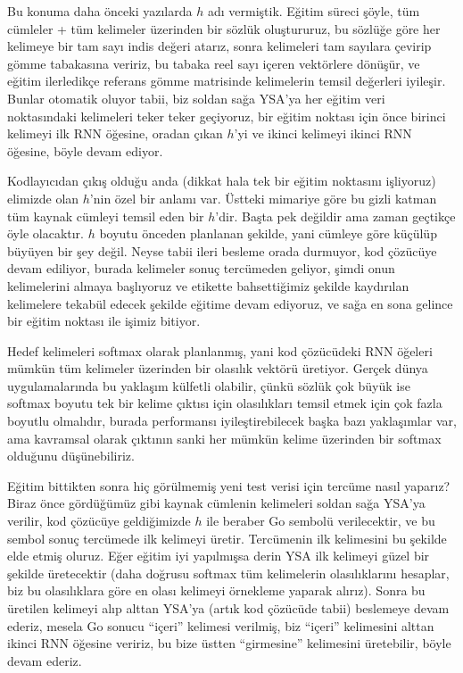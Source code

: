 \documentclass[12pt,fleqn]{article}\usepackage{../../common}
\begin{document}
Bu konuma daha önceki yazılarda $h$ adı vermiştik. Eğitim süreci şöyle, tüm
cümleler + tüm kelimeler üzerinden bir sözlük oluştururuz, bu sözlüğe göre
her kelimeye bir tam sayı indis değeri atarız, sonra kelimeleri tam
sayılara çevirip gömme tabakasına veririz, bu tabaka reel sayı içeren
vektörlere dönüşür, ve eğitim ilerledikçe referans gömme matrisinde
kelimelerin temsil değerleri iyileşir. Bunlar otomatik oluyor tabii, biz
soldan sağa YSA'ya her eğitim veri noktasındaki kelimeleri teker teker
geçiyoruz, bir eğitim noktası için önce birinci kelimeyi ilk RNN öğesine,
oradan çıkan $h$'yi ve ikinci kelimeyi ikinci RNN öğesine, böyle devam
ediyor.

Kodlayıcıdan çıkış olduğu anda (dikkat hala tek bir eğitim noktasını
işliyoruz) elimizde olan $h$'nin özel bir anlamı var. Üstteki mimariye göre
bu gizli katman tüm kaynak cümleyi temsil eden bir $h$'dir. Başta pek
değildir ama zaman geçtikçe öyle olacaktır. $h$ boyutu önceden planlanan
şekilde, yani cümleye göre küçülüp büyüyen bir şey değil. Neyse tabii ileri
besleme orada durmuyor, kod çözücüye devam ediliyor, burada kelimeler sonuç
tercümeden geliyor, şimdi onun kelimelerini almaya başlıyoruz ve etikette
bahsettiğimiz şekilde kaydırılan kelimelere tekabül edecek şekilde eğitime
devam ediyoruz, ve sağa en sona gelince bir eğitim noktası ile işimiz
bitiyor.

Hedef kelimeleri softmax olarak planlanmış, yani kod çözücüdeki RNN öğeleri
mümkün tüm kelimeler üzerinden bir olasılık vektörü üretiyor. Gerçek dünya
uygulamalarında bu yaklaşım külfetli olabilir, çünkü sözlük çok büyük ise
softmax boyutu tek bir kelime çıktısı için olasılıkları temsil etmek için
çok fazla boyutlu olmalıdır, burada performansı iyileştirebilecek başka
bazı yaklaşımlar var, ama kavramsal olarak çıktının sanki her mümkün kelime
üzerinden bir softmax olduğunu düşünebiliriz.

Eğitim bittikten sonra hiç görülmemiş yeni test verisi için tercüme nasıl
yaparız? Biraz önce gördüğümüz gibi kaynak cümlenin kelimeleri soldan sağa
YSA'ya verilir, kod çözücüye geldiğimizde $h$ ile beraber Go sembolü
verilecektir, ve bu sembol sonuç tercümede ilk kelimeyi üretir. Tercümenin
ilk kelimesini bu şekilde elde etmiş oluruz. Eğer eğitim iyi yapılmışsa
derin YSA ilk kelimeyi güzel bir şekilde üretecektir (daha doğrusu softmax
tüm kelimelerin olasılıklarını hesaplar, biz bu olasılıklara göre en olası
kelimeyi örnekleme yaparak alırız). Sonra bu üretilen kelimeyi alıp alttan
YSA'ya (artık kod çözücüde tabii) beslemeye devam ederiz, mesela Go sonucu
``içeri'' kelimesi verilmiş, biz ``içeri'' kelimesini alttan ikinci RNN
öğesine veririz, bu bize üstten ``girmesine'' kelimesini üretebilir, böyle
devam ederiz.
\end{document}
